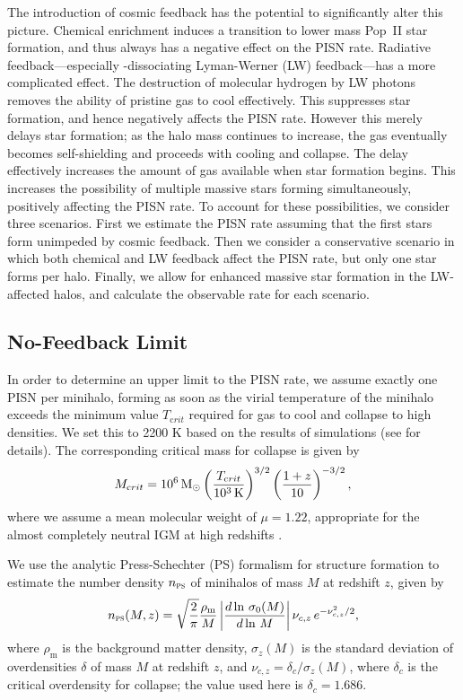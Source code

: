 \documentclass[../thesis.tex]{subfiles}
\begin{document}
The introduction of cosmic feedback has the potential to significantly
alter this picture.  Chemical enrichment induces a transition to lower
mass Pop~II star formation, and thus always has a negative effect on
the PISN rate.  Radiative feedback---especially \htwo-dissociating
Lyman-Werner (LW) feedback---has a more complicated effect.  The
destruction of molecular hydrogen by LW photons removes the ability of
pristine gas to cool effectively. This suppresses star formation, and
hence negatively affects the PISN rate.  However this merely delays
star formation; as the halo mass continues to increase, the gas
eventually becomes self-shielding and proceeds with cooling and
collapse.  The delay effectively increases the amount of gas available
when star formation begins. This increases the possibility of multiple
massive stars forming simultaneously, positively affecting the PISN
rate.  To account for these possibilities, we consider three
scenarios.  First we estimate the PISN rate assuming that the first
stars form unimpeded by cosmic feedback. Then we consider a
conservative scenario in which both chemical and LW feedback affect
the PISN rate, but only one star forms per halo.  Finally, we allow
for enhanced massive star formation in the LW-affected halos, and calculate
the observable rate for each scenario.


\subsection{No-Feedback Limit}
In order to determine an upper limit to the PISN rate, we assume
exactly one PISN per minihalo, forming as soon as the virial
temperature of the minihalo exceeds the minimum value $T_{\mathrm crit}$
required for gas to cool and collapse to high densities. We set this
to 2200 K based on the results of simulations (see
 for details).  The corresponding critical mass
for collapse is given by
\begin{equation}
  \label{mcriteq}
    M_{\mathrm crit} = 10^6\,\mathrm{M}_{\odot}
    \left( \frac{T_{\mathrm crit}}{10^3 \,{\mathrm K}}\right)^{3/2} 
   \left( \frac{1+z}{10}\right)^{-3/2},
\end{equation}
where we assume a mean molecular weight of $\mu=1.22$, appropriate for
the almost completely neutral IGM at high redshifts
\citep{BarkanaLoeb2001}.

We use the analytic Press-Schechter (PS) formalism for structure
formation \citep{PressSchechter1974} to estimate the number density
$n_{\textsc{ps}}$ of minihalos of mass $M$ at redshift $z$, given by
\begin{equation}
n_{\textsc{ps}} (M,z) = \sqrt{\frac{2}{\pi}}
\frac{\rho_{\mathrm m}}{M}\left|\frac{d\ln \,\sigma_{0}(M)}{d\ln \,M}
\right|\nu_{c,z} \,e^{-\nu_{c,z}^2 /2},
\end{equation}
where $\rho_{\mathrm m}$ is the background matter density, $\sigma_{z}(M)$
is the standard deviation of overdensities $\delta$ of mass $M$ at
redshift $z$, and $\nu_{c,z} = \delta_c / \sigma_{z}(M)$, where
$\delta_c$ is the critical overdensity for collapse; the value used
here is $\delta_c =1.686$.
\end{document}
